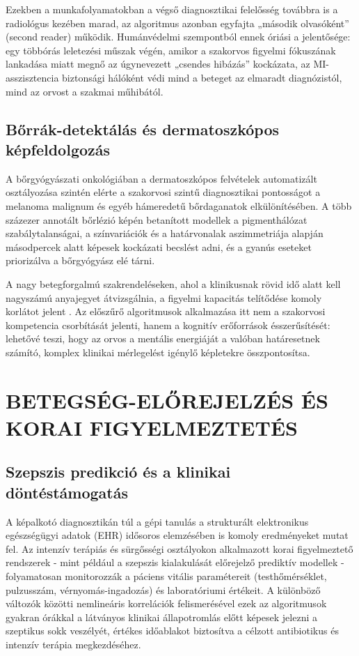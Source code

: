 \documentclass[12pt,a4paper,oneside]{book}
\begin{document}
Ezekben a munkafolyamatokban a végső diagnosztikai felelősség továbbra is a radiológus kezében marad, az algoritmus azonban egyfajta „második olvasóként” (second reader) működik. Humánvédelmi szempontból ennek óriási a jelentősége: egy többórás leletezési műszak végén, amikor a szakorvos figyelmi fókuszának lankadása miatt megnő az úgynevezett „csendes hibázás” kockázata, az MI-asszisztencia biztonsági hálóként védi mind a beteget az elmaradt diagnózistól, mind az orvost a szakmai műhibától.

\subsection{Bőrrák-detektálás és dermatoszkópos képfeldolgozás}

A bőrgyógyászati onkológiában a dermatoszkópos felvételek automatizált osztályozása szintén elérte a szakorvosi szintű diagnosztikai pontosságot a melanoma malignum és egyéb hámeredetű bőrdaganatok elkülönítésében. A több százezer annotált bőrlézió képén betanított modellek a pigmenthálózat szabálytalanságai, a színvariációk és a határvonalak aszimmetriája alapján másodpercek alatt képesek kockázati becslést adni, és a gyanús eseteket priorizálva a bőrgyógyász elé tárni.

A nagy betegforgalmú szakrendeléseken, ahol a klinikusnak rövid idő alatt kell nagyszámú anyajegyet átvizsgálnia, a figyelmi kapacitás telítődése komoly korlátot jelent \cite{sweller2011}. Az előszűrő algoritmusok alkalmazása itt nem a szakorvosi kompetencia csorbítását jelenti, hanem a kognitív erőforrások ésszerűsítését: lehetővé teszi, hogy az orvos a mentális energiáját a valóban határesetnek számító, komplex klinikai mérlegelést igénylő képletekre összpontosítsa.

\section{BETEGSÉG-ELŐREJELZÉS ÉS KORAI FIGYELMEZTETÉS}

\subsection{Szepszis predikció és a klinikai döntéstámogatás}

A képalkotó diagnosztikán túl a gépi tanulás a strukturált elektronikus egészségügyi adatok (EHR) idősoros elemzésében is komoly eredményeket mutat fel. Az intenzív terápiás és sürgősségi osztályokon alkalmazott korai figyelmeztető rendszerek - mint például a szepszis kialakulását előrejelző prediktív modellek - folyamatosan monitorozzák a páciens vitális paramétereit (testhőmérséklet, pulzusszám, vérnyomás-ingadozás) és laboratóriumi értékeit. A különböző változók közötti nemlineáris korrelációk felismerésével ezek az algoritmusok gyakran órákkal a látványos klinikai állapotromlás előtt képesek jelezni a szeptikus sokk veszélyét, értékes időablakot biztosítva a célzott antibiotikus és intenzív terápia megkezdéséhez.
\end{document}
